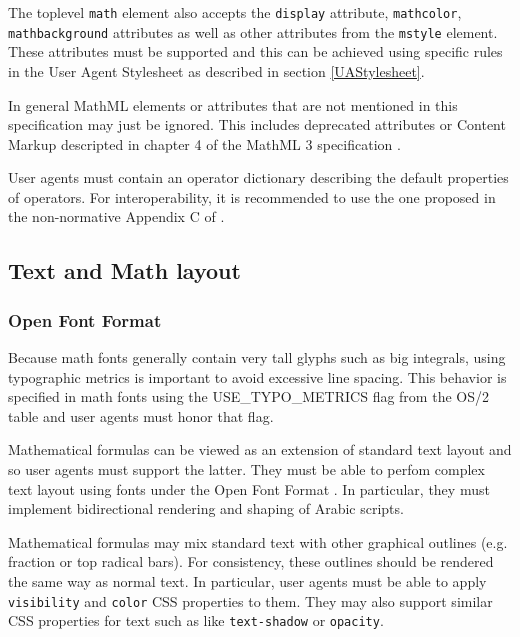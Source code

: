 The toplevel {\tt math} element also accepts the {\tt display} attribute,
{\tt mathcolor}, {\tt mathbackground} attributes as well as other attributes
from the {\tt mstyle} element. These attributes must be supported and this
can be achieved using specific rules in the User Agent Stylesheet
as described in section \ref{UAStylesheet}.

In general MathML elements or attributes that are not mentioned in this
specification may just be ignored. This includes deprecated attributes or
Content Markup descripted in chapter 4 of the MathML 3 specification
\cite{MathML3}.

User agents must contain an operator dictionary describing the default
properties of operators. For interoperability, it is recommended to use the one
proposed in the non-normative Appendix C of \cite{MathML3}.

\subsection{Text and Math layout}

\subsubsection{Open Font Format}

Because math fonts generally contain very tall glyphs such as big integrals,
using typographic metrics is important to avoid excessive line spacing. This
behavior is specified in math fonts using the USE\_TYPO\_METRICS flag from the
OS/2 table \cite{OpenFontFormat3} and user agents must honor that flag.

Mathematical formulas can be viewed as an extension of standard text layout
and so user agents must support the latter. They must be able to perfom
complex text layout \cite{CTL} using fonts under the Open Font Format
\cite{OpenFontFormat3}. In particular, they must implement bidirectional
rendering and shaping of Arabic scripts.

Mathematical formulas may mix standard text with other graphical outlines
(e.g. fraction or top radical bars). For consistency, these outlines should
be rendered the same way as normal text. In particular, user agents must be
able to apply {\tt visibility} and {\tt color} CSS properties to them. They may
also support similar CSS properties for text such as like {\tt text-shadow} or
{\tt opacity}.

